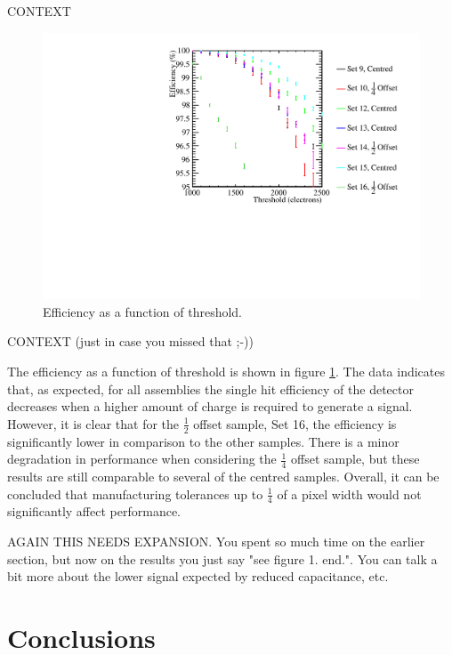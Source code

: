 CONTEXT

\begin{figure}
\centering
\includegraphics[width=1.0\textwidth]{CLICdpVertex/Plots/TestBeamData/EfficiencyThresholdPlot.pdf}
\caption[Efficiency as a function of threshold.]{Efficiency as a function of threshold.}
\label{fig:efficiency}
\end{figure}

CONTEXT (just in case you missed that ;-))

The efficiency as a function of threshold is shown in figure \ref{fig:efficiency}.  The data indicates that, as expected, for all assemblies the single hit efficiency of the detector decreases when a higher amount of charge is required to generate a signal.  However, it is clear that for the $\frac{1}{2}$ offset sample, Set 16, the efficiency is significantly lower in comparison to the other samples. There is a minor degradation in performance when considering the $\frac{1}{4}$ offset sample, but these results are still comparable to several of the centred samples.  Overall, it can be concluded that manufacturing tolerances up to $\frac{1}{4}$ of a pixel width would not significantly affect performance.    

AGAIN THIS NEEDS EXPANSION. You spent so much time on the earlier section, but now on the results you just say "see figure 1. end.". You can talk a bit more about the lower signal expected by reduced capacitance, etc.


\section{Conclusions}



  
